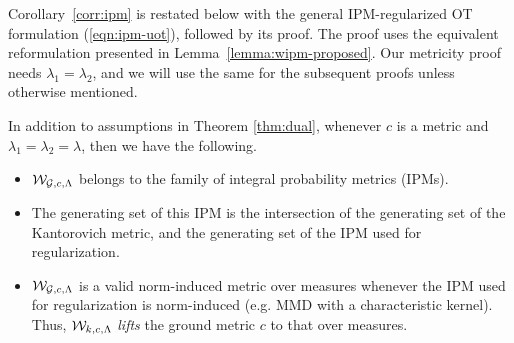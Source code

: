 Corollary~\ref{corr:ipm} is restated below with the general IPM-regularized OT formulation (\ref{eqn:ipm-uot}), followed by its proof. The proof uses the equivalent reformulation presented in Lemma~\ref{lemma:wipm-proposed}. Our metricity proof needs $\lambda_1=\lambda_2$, and we will use the same for the subsequent proofs unless otherwise mentioned.
\begin{corollaryBox}
\begin{corollary}\label{corr:ipm-duplicate}
In addition to assumptions in Theorem \ref{thm:dual}, whenever $c$ is a metric and $\lambda_1=\lambda_2=\lambda$, then we have the following.
\begin{itemize}
    \item $\mathcal{W}_{\mathcal{G}, c, \Lambda}$ belongs to the family of integral probability metrics (IPMs).
    \item The generating set of this IPM is the intersection of the generating set of the Kantorovich metric, and the generating set of the IPM used for regularization.
    \item $\mathcal{W}_{\mathcal{G}, c, \Lambda}$ is a valid norm-induced metric over measures whenever the IPM used for regularization is norm-induced (e.g. MMD with a characteristic kernel). Thus, $\mathcal{W}_{k, c, \Lambda}$ \emph{lifts} the ground metric $c$ to that over measures.
\end{itemize} 
\end{corollary}
\end{corollaryBox}
